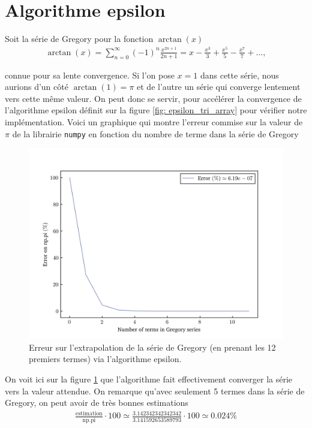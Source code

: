 \section{Algorithme epsilon} \label{sec: annexe_epsilon}
    Soit la série de Gregory pour la fonction $\arctan(x)$
    \begin{align*}
        \arctan(x) = \sum_{n = 0}^\infty(-1)^n\frac{x^{2n + 1}}{2n + 1} = x - \frac{x^3}{3} + \frac{x^5}{5} - \frac{x^7}{7} + \dots,
        \label{eq: gregory}
    \end{align*}
    
    connue pour sa lente convergence. Si l'on pose $x = 1$ dans cette série, nous aurions d'un côté $\arctan(1) = \pi$ et de l'autre un série qui converge lentement vers cette même valeur. On peut donc se servir, pour accélérer la convergence de l'algorithme epsilon définit sur la figure \ref{fig: epsilon_tri_array} pour vérifier notre implémentation. Voici un graphique qui montre l'erreur commise sur la valeur de $\pi$ de la librairie \texttt{numpy} en fonction du nombre de terme dans la série de Gregory
    \begin{figure}[h!]
        \centering
        \includegraphics[scale=0.4]{figs/error_percentage.png}
        \caption{Erreur sur l'extrapolation de la série de Gregory (en prenant les 12 premiers termes) via l'algorithme epsilon.}
        \label{fig: epsilon_error}
    \end{figure}
    On voit ici sur la figure \ref{fig: epsilon_error} que l'algorithme fait effectivement converger la série vers la valeur attendue. On remarque qu'avec seulement 5 termes dans la série de Gregory, on peut avoir de très bonnes estimations
    \begin{align*}
        \frac{\text{estimation}}{\text{np.pi}}\cdot 100 \simeq \frac{3.142342342342342}{3.141592653589793}\cdot 100 \simeq  0.024\%
    \end{align*}
